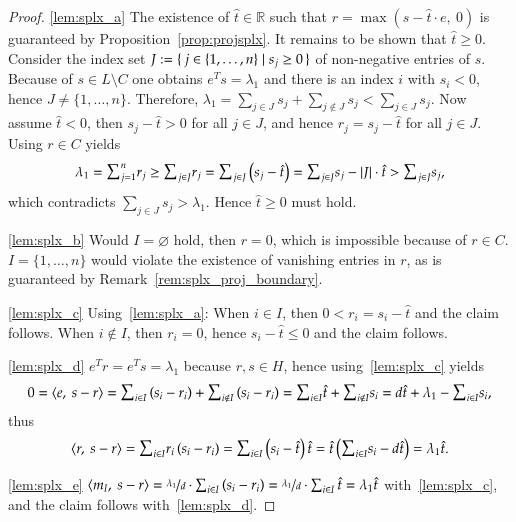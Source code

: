 \documentclass[twoside,11pt]{article}
\newcommand{\R}{\mathbb{R}}
\newcommand{\0}{\mathcal{O}}
\newcommand{\transp}{^T}
\newcommand{\abs}[1]{\left\vert #1 \right\vert}
\newcommand{\scp}[2]{\left<#1,\ #2\right>}
\newcommand{\discint}[2]{\{#1,\dotsc,#2\}}
\newcommand{\inint}[2]{\in\discint{#1}{#2}}
\newcommand{\smallsum}{\scalebox{1.2}{$\sum$}}
\renewcommand{\emptyset}{\varnothing}
\begin{document}
\begin{proof}
\ref{lem:splx_a}
The existence of $\hat{t}\in\R$ such that $r = \max\left(s - \hat{t}\cdot e,\ 0\right)$ is guaranteed by Proposition~\ref{prop:projsplx}.
It remains to be shown that $\hat{t}\geq 0$.
Consider the index set $J := \set{j\inint{1}{n} | s_j\geq 0}$ of non-negative entries of $s$.
Because of $s\in L\setminus C$ one obtains $e\transp s = \lambda_1$ and there is an index $i$ with $s_i < 0$, hence $J\neq\discint{1}{n}$.
Therefore, $\lambda_1 = \sum_{j\in J}s_j + \sum_{j\not\in J}s_j < \sum_{j\in J}s_j$.
Now assume $\hat{t} < 0$, then $s_j - \hat{t} > 0$ for all $j\in J$, and hence $r_j = s_j - \hat{t}$ for all $j\in J$.
Using $r\in C$ yields
\begin{displaymath}
  \lambda_1
  = \smallsum_{j=1}^nr_j
  \geq \smallsum_{j\in J}r_j
  = \smallsum_{j\in J}\left(s_j - \hat{t}\right)
  = \smallsum_{j\in J}s_j - \abs{J}\cdot\hat{t}
  > \smallsum_{j\in J}s_j\text{,}
\end{displaymath}
which contradicts $\sum_{j\in J}s_j > \lambda_1$.
Hence $\hat{t}\geq 0$ must hold.

\ref{lem:splx_b}
Would $I = \emptyset$ hold, then $r = 0$, which is impossible because of $r\in C$.
$I = \discint{1}{n}$ would violate the existence of vanishing entries in $r$, as is guaranteed by Remark~\ref{rem:splx_proj_boundary}.

\ref{lem:splx_c}
Using~\ref{lem:splx_a}:
When $i\in I$, then $0 < r_i = s_i - \hat{t}$ and the claim follows.
When $i\not\in I$, then $r_i = 0$, hence $s_i - \hat{t} \leq 0$ and the claim follows.

\ref{lem:splx_d}
$e\transp r = e\transp s = \lambda_1$ because $r,s\in H$, hence using~\ref{lem:splx_c} yields
\begin{displaymath}
  0
  = \scp{e}{s - r}
  = \smallsum_{i\in I}\left(s_i - r_i\right) + \smallsum_{i\not\in I}\left(s_i - r_i\right)
  = \smallsum_{i\in I}\hat{t} + \smallsum_{i\not\in I}s_i
  = d\hat{t} + \lambda_1 - \smallsum_{i\in I}s_i\text{,}
\end{displaymath}
thus
\begin{displaymath}
  \scp{r}{s - r}
  = \smallsum_{i\in I}r_i\left(s_i - r_i\right)
  = \smallsum_{i\in I}\left(s_i - \hat{t}\right)\hat{t}
  = \hat{t}\left(\smallsum_{i\in I}s_i - d\hat{t}\right)
  = \lambda_1\hat{t}\text{.}
\end{displaymath}

\ref{lem:splx_e}
$\scp{m_I}{s - r} = \nicefrac{\lambda_1}{d}\cdot\sum_{i\in I}\left(s_i - r_i\right) = \nicefrac{\lambda_1}{d}\cdot\sum_{i\in I}\hat{t} = \lambda_1\hat{t}$ with~\ref{lem:splx_c}, and the claim follows with~\ref{lem:splx_d}.


\end{proof}
\end{document}
